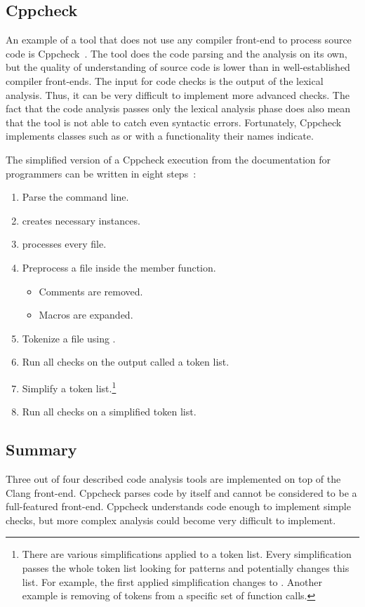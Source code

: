\subsection{Cppcheck}
An example of a tool that does not use any compiler front-end to process source code is Cppcheck~\cite{cppcheck}. The tool does the code parsing and the analysis on its own, but the quality of understanding of source code is lower than in well-established compiler front-ends. The input for code checks is the output of the lexical analysis. Thus, it can be very difficult to implement more advanced checks. The fact that the code analysis passes only the lexical analysis phase does also mean that the tool is not able to catch even syntactic errors. Fortunately, Cppcheck implements classes such as  or  with a functionality their names indicate.

The simplified version of a Cppcheck execution from the documentation for programmers can be written in eight steps~\cite{cppcheck-doxygen}:

\begin{enumerate}
\item Parse the command line.
\item {} creates necessary  instances.
\item {} processes every file.
\item Preprocess a file inside the  member function.
    \begin{itemize}
    \item Comments are removed.
    \item Macros are expanded.
    \end{itemize}
\item Tokenize a file using .
\item Run all checks on the  output called a token list.
\item Simplify a token list.\footnote{There are various simplifications applied to a token list. Every simplification passes the whole token list looking for patterns and potentially changes this list. For example, the first applied simplification changes  to . Another example is removing of  tokens from a specific set of function calls.}
\item Run all checks on a simplified token list.
\end{enumerate}

\subsection{Summary}
Three out of four described code analysis tools are implemented on top of the Clang front-end. Cppcheck parses code by itself and cannot be considered to be a full-featured front-end. Cppcheck understands code enough to implement simple checks, but more complex analysis could become very difficult to implement.


